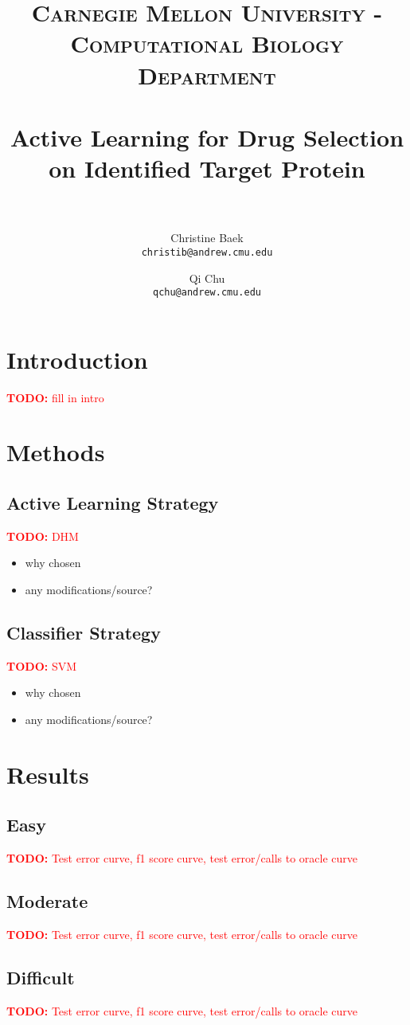 \documentclass[paper=a4, fontsize=11pt]{scrartcl}
\title{
		\usefont{OT1}{bch}{b}{n}
		\normalfont \normalsize \textsc{Carnegie Mellon University - Computational Biology Department} \\ [25pt]
		\horrule{0.5pt} \\[0.4cm]
		\huge Active Learning for Drug Selection\\ on Identified Target Protein \\
		\horrule{2pt} \\[0.5cm]
}
\author{
  Christine Baek\\
  \normalsize\texttt{christib@andrew.cmu.edu}
  \and
  Qi Chu\\
  \normalsize\texttt{qchu@andrew.cmu.edu}
}
\date{}
\newcommand{\TODO}[1]{\textcolor{red}{\textbf{TODO: } #1}}
\numberwithin{equation}{section}		%
\numberwithin{figure}{section}			%
\numberwithin{table}{section}				%
\begin{document}
\maketitle
\section{Introduction}

\TODO{fill in intro}


\section{Methods}

\subsection{Active Learning Strategy}

\TODO{DHM}
\begin{itemize}
\item why chosen
\item any modifications/source?
\end{itemize}

\subsection{Classifier Strategy}

\TODO{SVM}
\begin{itemize}
\item why chosen
\item any modifications/source?
\end{itemize}

\section{Results}

\subsection{Easy}
\TODO{Test error curve, f1 score curve, test error/calls to oracle curve}

\subsection{Moderate}
\TODO{Test error curve, f1 score curve, test error/calls to oracle curve}


\subsection{Difficult}
\TODO{Test error curve, f1 score curve, test error/calls to oracle curve}
\end{document}
